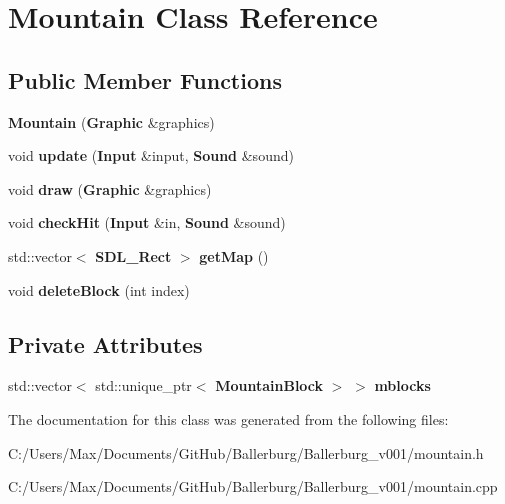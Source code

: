\section{Mountain Class Reference}
\label{class_mountain}
\subsection*{Public Member Functions}
\begin{DoxyCompactItemize}
\item 
{\bfseries Mountain} ({\bf Graphic} \&graphics)\label{class_mountain_ae5e5250815fe5cf2f8448a331c8c7604}

\item 
void {\bfseries update} ({\bf Input} \&input, {\bf Sound} \&sound)\label{class_mountain_ab0ebe70029e2bf21d50d7f0517217e12}

\item 
void {\bfseries draw} ({\bf Graphic} \&graphics)\label{class_mountain_acc7a7808b86e6e6ccd50684fb10a884c}

\item 
void {\bfseries check\+Hit} ({\bf Input} \&in, {\bf Sound} \&sound)\label{class_mountain_a5cf0e34242918fdf2f197c8a08bc6721}

\item 
std\+::vector$<$ {\bf S\+D\+L\+\_\+\+Rect} $>$ {\bfseries get\+Map} ()\label{class_mountain_a052e5b287efe7e11c90ce0af651b349f}

\item 
void {\bfseries delete\+Block} (int index)\label{class_mountain_ab15bc8f4bb480c9553e05d2755eb2e90}

\end{DoxyCompactItemize}
\subsection*{Private Attributes}
\begin{DoxyCompactItemize}
\item 
std\+::vector$<$ std\+::unique\+\_\+ptr$<$ {\bf Mountain\+Block} $>$ $>$ {\bfseries mblocks}\label{class_mountain_affc7841a0c1baa4576d9fbc52dae2f9c}

\end{DoxyCompactItemize}


The documentation for this class was generated from the following files\+:\begin{DoxyCompactItemize}
\item 
C\+:/\+Users/\+Max/\+Documents/\+Git\+Hub/\+Ballerburg/\+Ballerburg\+\_\+v001/mountain.\+h\item 
C\+:/\+Users/\+Max/\+Documents/\+Git\+Hub/\+Ballerburg/\+Ballerburg\+\_\+v001/mountain.\+cpp\end{DoxyCompactItemize}
